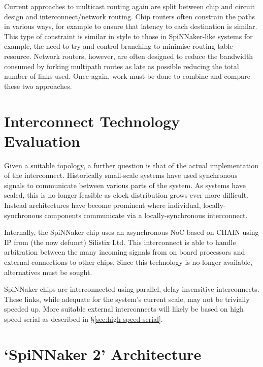 		Current approaches to multicast routing again are split between chip and
		circuit design and interconnect/network routing. Chip routers often
		constrain the paths in various ways, for example to ensure that latency to
		each destination is similar. This type of constraint is similar in style to
		those in SpiNNaker-like systems for example, the need to try and control
		branching to minimise routing table resource. Network routers, however, are
		often designed to reduce the bandwidth consumed by forking multipath routes
		as late as possible reducing the total number of links used. Once again,
		work must be done to combine and compare these two approaches.
	
	\section{Interconnect Technology Evaluation}
		
		
		Given a suitable topology, a further question is that of the actual
		implementation of the interconnect. Historically small-scale systems have
		used synchronous signals to communicate between various parts of the system.
		As systems have scaled, this is no longer feasible as clock distribution
		grows ever more difficult. Instead architectures have become prominent where
		individual, locally-synchronous components communicate via a
		locally-synchronous interconnect.
		
		Internally, the SpiNNaker chip uses an asynchronous NoC based on CHAIN
		\cite{plana07,bainbridge02} using IP from (the now defunct) Silistix Ltd.
		This interconnect is able to handle arbitration between the many incoming
		signals from on board processors and external connections to other chips.
		Since this technology is no-longer available, alternatives must be sought.
		
		SpiNNaker chips are interconnected using parallel, delay insensitive
		interconnects. These links, while adequate for the system's current scale,
		may not be trivially speeded up. More suitable external interconnects will
		likely be based on high speed serial as described in
		\S\ref{sec:high-speed-serial}.
		
		\section{`SpiNNaker 2' Architecture}
		
